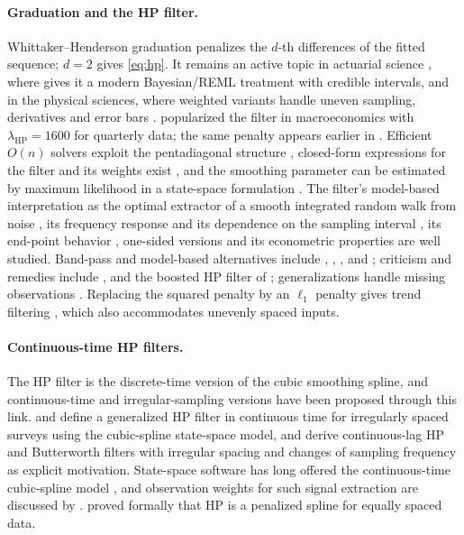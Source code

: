 \documentclass[11pt,a4paper]{article}
\theoremstyle{definition}
\theoremstyle{remark}
\begin{document}
\paragraph{Graduation and the HP filter.} Whittaker--Henderson graduation \citep{Whittaker1922,Henderson1924} penalizes the $d$-th differences of the fitted sequence; $d=2$ gives \eqref{eq:hp}. It remains an active topic in actuarial science \citep{NoconScott2012,Biessy2025}, where \citet{Biessy2025} gives it a modern Bayesian/REML treatment with credible intervals, and in the physical sciences, where weighted variants handle uneven sampling, derivatives and error bars \citep{Eilers2003,Garcia2010,MulderLagendijkVos2026}. \citet{HodrickPrescott1997} popularized the filter in macroeconomics with $\lambda_{\mathrm{HP}}=1600$ for quarterly data; the same penalty appears earlier in \citet{Leser1961}. Efficient $O(n)$ solvers exploit the pentadiagonal structure \citep{Weinert2007}, closed-form expressions for the filter and its weights exist \citep{CorneaMadeira2017,YamadaJahra2019}, and the smoothing parameter can be estimated by maximum likelihood in a state-space formulation \citep{Schlicht2005}. The filter's model-based interpretation as the optimal extractor of a smooth integrated random walk from noise \citep{KingRebelo1993,HarveyJaeger1993,KaiserMaravall2001}, its frequency response and its dependence on the sampling interval \citep{BaxterKing1999,RavnUhlig2002}, its end-point behavior \citep{MiseKimNewbold2005}, one-sided versions \citep{StockWatson1999} and its econometric properties \citep{deJongSakarya2016} are well studied. Band-pass and model-based alternatives include \citet{BaxterKing1999}, \citet{ChristianoFitzgerald2003}, \citet{Pollock2000}, \citet{Gomez2001} and \citet{HarveyTrimbur2003}; criticism and remedies include \citet{Hamilton2018}, \citet{Hodrick2020} and the boosted HP filter of \citet{PhillipsShi2021}; generalizations handle missing observations \citep{Yamada2020,Yamada2022}. Replacing the squared penalty by an $\ell_1$ penalty gives trend filtering \citep{KimKohBoydGorinevsky2009,Tibshirani2014}, which also accommodates unevenly spaced inputs.

\paragraph{Continuous-time HP filters.} The HP filter is the discrete-time version of the cubic smoothing spline, and continuous-time and irregular-sampling versions have been proposed through this link. \citet{IannacconeOtranto2003} and \citet{OtrantoIannaccone2005} define a generalized HP filter in continuous time for irregularly spaced surveys using the cubic-spline state-space model, and \citet{McElroyTrimbur2007} derive continuous-lag HP and Butterworth filters with irregular spacing and changes of sampling frequency as explicit motivation. State-space software has long offered the continuous-time cubic-spline model \citep{KoopmanShephardDoornik1999,Harvey1989,DurbinKoopman2012}, and observation weights for such signal extraction are discussed by \citet{KoopmanHarvey2003}. \citet{PaigeTrindade2010} proved formally that HP is a penalized spline for equally spaced data.
\end{document}
